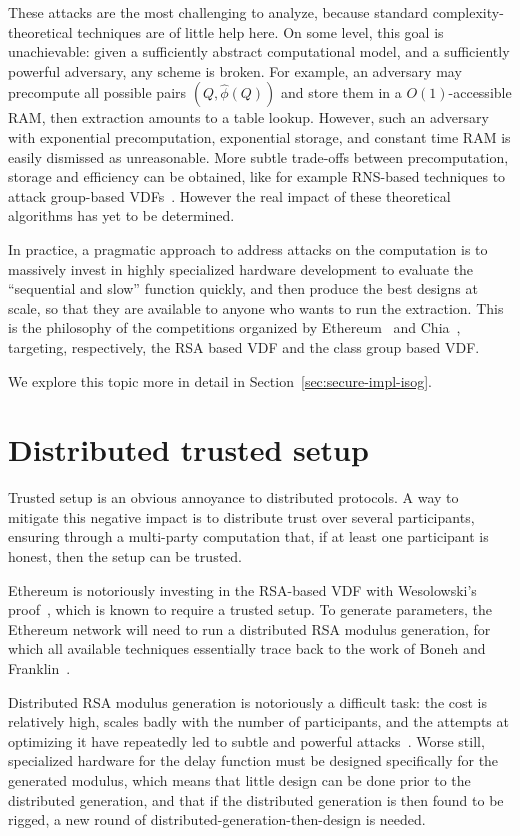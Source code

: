 \documentclass{llncs}
\begin{document}
These attacks are the most challenging to analyze, because standard
com\-plexity-theoretical techniques are of little help here. %
On some level, this goal is unachievable: given a sufficiently
abstract computational model, and a sufficiently powerful adversary,
any scheme is broken. %
For example, an adversary may precompute all possible pairs
$(Q,\hat\phi(Q))$ and store them in a $O(1)$-accessible RAM, then
extraction amounts to a table lookup. %
However, such an adversary with exponential precomputation,
exponential storage, and constant time RAM is easily dismissed as
unreasonable. %
More subtle trade-offs between precomputation, storage and efficiency
can be obtained, like for example RNS-based techniques to attack
group-based VDFs~\cite{BernsteinSorenson07}. %
However the real impact
of these theoretical algorithms has yet to be determined.

In practice, a pragmatic approach to address attacks on the
computation is to massively invest in highly specialized hardware
development to evaluate the ``sequential and slow'' function quickly,
and then produce the best designs at scale, so that they are available
to anyone who wants to run the extraction. %
This is the philosophy of the competitions organized by
Ethereum~\cite{ethereum-vdf} and Chia~\cite{chia-vdf}, targeting,
respectively, the RSA based VDF and the class group based VDF.

We explore this topic more in detail in
Section~\ref{sec:secure-impl-isog}.


\section{Distributed trusted setup}
\label{sec:distr-trust-setup}

Trusted setup is an obvious annoyance to distributed protocols. %
A way to mitigate this negative impact is to distribute trust over
several participants, ensuring through a multi-party computation that,
if at least one participant is honest, then the setup can be trusted.

Ethereum is notoriously investing in the RSA-based VDF with
Wesolowski's proof~\cite{ethereum-vdf,Wesolowski}, which is known to
require a trusted setup. %
To generate parameters, the Ethereum network will need to run a
distributed RSA modulus generation, for which all available techniques
essentially trace back to the work of Boneh and
Franklin~\cite{10.1007/BFb0052253}.

Distributed RSA modulus generation is notoriously a difficult task:
the cost is relatively high, scales badly with the number of
participants, and the attempts at optimizing it have repeatedly led to
subtle and powerful attacks~\cite{eth-octopus,eth-dogbyte}. %
Worse still, specialized hardware for the delay function must be
designed specifically for the generated modulus, which means that
little design can be done prior to the distributed generation, and
that if the distributed generation is then found to be rigged, a new
round of distributed-generation-then-design is needed.
\end{document}
